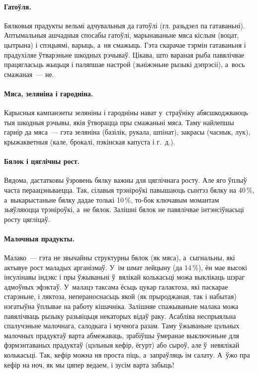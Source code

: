 \paragraph{Гатоўля.}
Бялковыя прадукты вельмі адчувальныя да гатоўлі (гл. разьдзел па гатаваньні). Аптымальныя ашчадныя спосабы гатоўлі, марынаваньне мяса кіслым (воцат, цытрына) і спэцыямі, варыць, а~ня смажыць. Гэта скарачае тэрмін гатаваньня і прадухіляе ўтварэньне шкодных рэчываў. Цікава, што вараная рыба павялічвае працягласьць жыцьця і паляпшае настрой (зьніжэньне рызыкі дэпрэсіі), а~вось смажаная~--- не.

\paragraph{Мяса, зеляніна і гародніна.}
Карысныя кампанэнты зеляніны і гародніны нават у~страўніку абясшкоджваюць тыя шкодныя рэчывы, якія ўтворацца пры смажаньні мяса. Таму найлепшы гарнір да мяса~--- гэта зеляніна (базілік, рукала, шпінат), закрасы (часнык, лук), крыжакветныя (кале, брокалі, пэкінская капуста і г.~д.).

\paragraph{Бялок і цяглічны рост.}
Вядома, дастатковы ўзровень бялку важны для цяглічнага росту. Але яго ўплыў часта пераацэньваецца. Так, сілавыя трэніроўкі павышаюць сынтэз бялку на 40\,\%, а~выкарыстаньне бялку дадае толькі 10\,\%, то-бок ключавым момантам зьяўляюцца трэніроўкі, а~не бялок. Залішні бялок не павялічвае інтэнсіўнасьці росту цягліцаў.

\paragraph{Малочныя прадукты.}
Малако~--- гэта не звычайны структурны бялок (як мяса), а~сыгнальны, які актывуе рост маладых арганізмаў. У~ім шмат лейцыну (да 14\,\%), ён мае высокі інсулінавы індэкс і пры ўжываньні ў~вялікай колькасьці можа выклікаць шэраг адмоўных эфэктаў. У~малацэ таксама ёсьць цукар галактоза, які паскарае старэньне, і ляктоза, непераноснасьць якой (як прыроджаная, так і набытая) нэгатыўна ўплывае на работу кішачніка. Залішняе спажываньне малака можа павялічваць рызыку разьвіцьця некаторых відаў раку. Асабліва неспрыяльна спалучэньне малочнага, салодкага і мучнога разам. Таму ўжываньне цэльных малочных прадуктаў варта абмежаваць, зрабіўшы ўмеранае выключэньне для фэрмэнтаваных прадуктаў (цэльныя кефір, ёгурт) або сыроў, але ў~невялікай колькасьці. Так, кефір можна ня проста піць, а~запраўляць ім салату. А~ўжо пра кефір на ноч, як мы цяпер ведаем, і зусім варта забыць!

